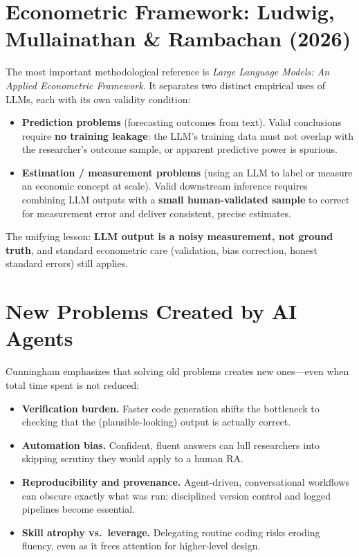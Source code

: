 \documentclass[11pt]{article}
\begin{document}
\section{Econometric Framework: Ludwig, Mullainathan \& Rambachan (2026)}

The most important methodological reference is \emph{Large Language Models: An
Applied Econometric Framework}. It separates two distinct empirical uses of LLMs,
each with its own validity condition:

\begin{itemize}
  \item \textbf{Prediction problems} (forecasting outcomes from text). Valid
        conclusions require \textbf{no training leakage}: the LLM's training data
        must not overlap with the researcher's outcome sample, or apparent predictive
        power is spurious.
  \item \textbf{Estimation / measurement problems} (using an LLM to label or measure
        an economic concept at scale). Valid downstream inference requires combining
        LLM outputs with a \textbf{small human-validated sample} to correct for
        measurement error and deliver consistent, precise estimates.
\end{itemize}

\noindent The unifying lesson: \textbf{LLM output is a noisy measurement, not ground
truth}, and standard econometric care (validation, bias correction, honest
standard errors) still applies.

\section{New Problems Created by AI Agents}

Cunningham emphasizes that solving old problems creates new ones---even when total
time spent is not reduced:

\begin{itemize}
  \item \textbf{Verification burden.} Faster code generation shifts the bottleneck
        to checking that the (plausible-looking) output is actually correct.
  \item \textbf{Automation bias.} Confident, fluent answers can lull researchers into
        skipping scrutiny they would apply to a human RA.
  \item \textbf{Reproducibility and provenance.} Agent-driven, conversational
        workflows can obscure exactly what was run; disciplined version control and
        logged pipelines become essential.
  \item \textbf{Skill atrophy vs.\ leverage.} Delegating routine coding risks
        eroding fluency, even as it frees attention for higher-level design.
\end{itemize}
\end{document}
